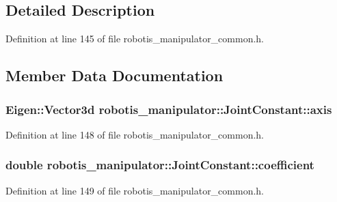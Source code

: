 \subsection{Detailed Description}


Definition at line 145 of file robotis\+\_\+manipulator\+\_\+common.\+h.



\subsection{Member Data Documentation}
\subsubsection[{\texorpdfstring{axis}{axis}}]{\setlength{\rightskip}{0pt plus 5cm}Eigen\+::\+Vector3d robotis\+\_\+manipulator\+::\+Joint\+Constant\+::axis}\hypertarget{structrobotis__manipulator_1_1_joint_constant_aa3bf091d44be75bd46e5052fd32fccc6}{}\label{structrobotis__manipulator_1_1_joint_constant_aa3bf091d44be75bd46e5052fd32fccc6}


Definition at line 148 of file robotis\+\_\+manipulator\+\_\+common.\+h.

\subsubsection[{\texorpdfstring{coefficient}{coefficient}}]{\setlength{\rightskip}{0pt plus 5cm}double robotis\+\_\+manipulator\+::\+Joint\+Constant\+::coefficient}\hypertarget{structrobotis__manipulator_1_1_joint_constant_acd88ff436867374790745f4661b12821}{}\label{structrobotis__manipulator_1_1_joint_constant_acd88ff436867374790745f4661b12821}


Definition at line 149 of file robotis\+\_\+manipulator\+\_\+common.\+h.

